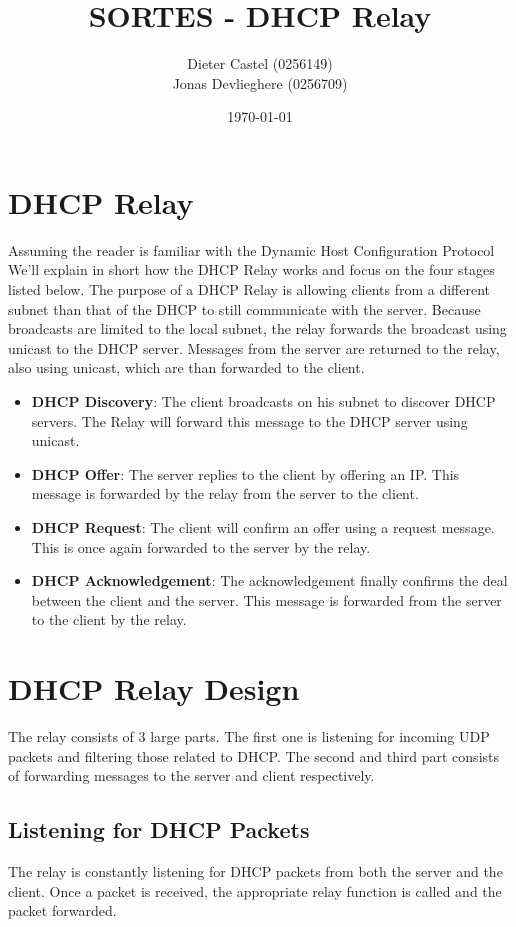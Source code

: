 \documentclass[11pt]{article}
\title{SORTES - DHCP Relay}
\author{Dieter Castel (0256149) \\ Jonas Devlieghere (0256709)}
\date{\today}
\begin{document}
\maketitle
\newpage

\tableofcontents
\newpage

\section{DHCP Relay}
Assuming the reader is familiar with the Dynamic Host Configuration Protocol
We'll explain in short how the DHCP Relay works and focus on the four stages
listed below. The purpose of a DHCP Relay is allowing clients from a different
subnet than that of the DHCP to still communicate with the server. Because
broadcasts are limited to the local subnet, the relay forwards the broadcast
using unicast to the DHCP server. Messages from the server are returned to the
relay, also using unicast, which are than forwarded to the client.

\begin{itemize}
	\item \textbf{DHCP Discovery}: The client broadcasts on his subnet to
	discover DHCP servers. The Relay will forward this message to the DHCP
	server using unicast.
	\item \textbf{DHCP Offer}: The server replies to the client by offering an
	IP. This message is forwarded by the relay from the server to the client.
	\item \textbf{DHCP Request}: The client will confirm an offer using a request message. This is once again forwarded to the server by the relay.
	\item \textbf{DHCP Acknowledgement}: The acknowledgement finally confirms
	the deal between the client and the server. This message is forwarded from
	the server to the client by the relay.
\end{itemize}

\section{DHCP Relay Design}
The relay consists of 3 large parts. The first one is listening for incoming UDP
packets and filtering those related to DHCP. The second and third part consists
of forwarding messages to the server and client respectively.

\subsection{Listening for DHCP Packets}
The relay is constantly listening for DHCP packets from both the server and the
client. Once a packet is received, the appropriate relay function is called and
the packet forwarded.
\end{document}
